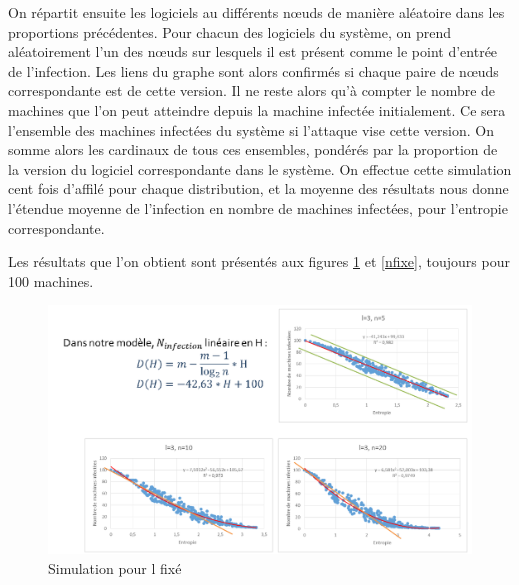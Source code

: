 On répartit ensuite les logiciels au différents nœuds de manière aléatoire dans les proportions précédentes.
Pour chacun des logiciels du système, on prend aléatoirement l'un des nœuds sur lesquels il est présent comme le point d'entrée de l'infection. Les liens du graphe sont alors confirmés si chaque paire de nœuds correspondante est de cette version. Il ne reste alors qu'à compter le nombre de machines que l'on peut atteindre depuis la machine infectée initialement. Ce sera l'ensemble des machines infectées du système si l'attaque vise cette version.
On somme alors les cardinaux de tous ces ensembles, pondérés par la proportion de la version du logiciel correspondante dans le système.
On effectue cette simulation cent fois d'affilé pour chaque distribution, et la moyenne des résultats nous donne l'étendue moyenne de l'infection en nombre de machines infectées, pour l'entropie correspondante.

Les résultats que l'on obtient sont présentés aux figures \ref{lfixe} et \ref{nfixe}, toujours pour 100 machines.

\begin{figure}[!ht]
\centering
     \includegraphics[width=1.0\linewidth]{Paul/python/lfixe.png}
     \caption{Simulation pour l fixé}
     \label{lfixe}
\end{figure}

